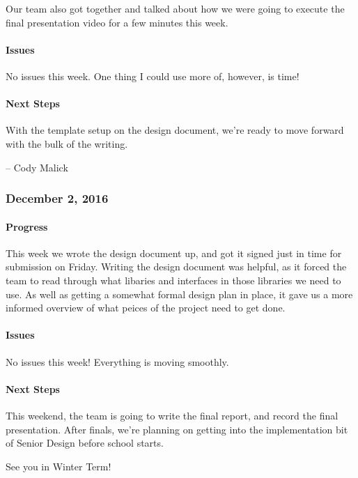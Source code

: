 \documentclass[10pt,onecolumn,journal,draftclsnofoot]{IEEEtran}
\begin{document}
Our team also got together and talked about how we were going to execute
the final presentation video for a few minutes this week.

\paragraph{Issues} 

No issues this week. One thing I could use more of, however, is time!

\paragraph{Next Steps} 

With the template setup on the design document, we're ready to move
forward with the bulk of the writing.

-- Cody Malick

\subsubsection{December 2, 2016} 

\paragraph{Progress} 

This week we wrote the design document up, and got it signed just in
time for submission on Friday. Writing the design document was helpful,
as it forced the team to read through what libaries and interfaces in
those libraries we need to use. As well as getting a somewhat formal
design plan in place, it gave us a more informed overview of what peices
of the project need to get done.

\paragraph{Issues} 

No issues this week! Everything is moving smoothly.

\paragraph{Next Steps} 

This weekend, the team is going to write the final report, and record
the final presentation. After finals, we're planning on getting into the
implementation bit of Senior Design before school starts.

See you in Winter Term!
\end{document}
